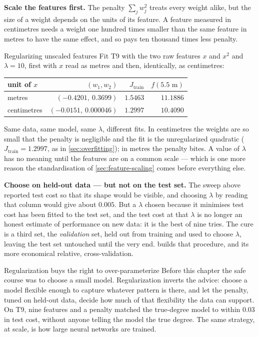 \textbf{Scale the features first.} The penalty $\sum_j w_j^2$ treats every
weight alike, but the size of a weight depends on the units of its feature. A
feature measured in centimetres needs a weight one hundred times smaller than
the same feature in metres to have the same effect, and so pays ten thousand
times less penalty.

\begin{pitfall}{Regularizing unscaled features}
Fit T9 with the two raw features $x$ and $x^2$ and $\lambda = 10$, first with $x$
read as metres and then, identically, as centimetres:

\begin{center}
\small
\renewcommand{\arraystretch}{1.15}
\begin{tabular}{@{}lrrr@{}}
\toprule
unit of $x$ & $(w_1, w_2)$ & $J_{\text{train}}$ & $f(5.5\text{ m})$\\
\midrule
metres      & $(-0.4201,\ 0.3699)$   & $1.5463$ & $11.1886$\\
centimetres & $(-0.0151,\ 0.000046)$ & $1.2997$ & $10.4090$\\
\bottomrule
\end{tabular}
\end{center}

Same data, same model, same $\lambda$, different fits. In centimetres the
weights are so small that the penalty is negligible and the fit is the
unregularized quadratic ($J_{\text{train}} = 1.2997$, as in
\cref{sec:overfitting}); in metres the penalty bites. A value of $\lambda$ has
no meaning until the features are on a common scale --- which is one more reason
the standardisation of \cref{sec:feature-scaling} comes before everything else.
\end{pitfall}

\textbf{Choose on held-out data --- but not on the test set.} The sweep above
reported test cost so that its shape would be visible, and choosing $\lambda$ by
reading that column would give about $0.005$. But a $\lambda$ chosen because it
minimises test cost has been fitted to the test set, and the test cost at that
$\lambda$ is no longer an honest estimate of performance on new data: it is the
best of nine tries. The cure is a third set, the \emph{validation} set, held out
from training and used to choose $\lambda$, leaving the test set untouched until
the very end.  builds that procedure, and its more economical
relative, cross-validation.

\begin{keyinsight}{Regularization buys the right to over-parameterize}
Before this chapter the safe course was to choose a small model. Regularization
inverts the advice: choose a model flexible enough to capture whatever pattern
is there, and let the penalty, tuned on held-out data, decide how much of that
flexibility the data can support. On T9, nine features and a penalty matched
the true-degree model to within $0.03$ in test cost, without anyone telling the
model the true degree. The same strategy, at scale, is how large neural networks
are trained.
\end{keyinsight}

